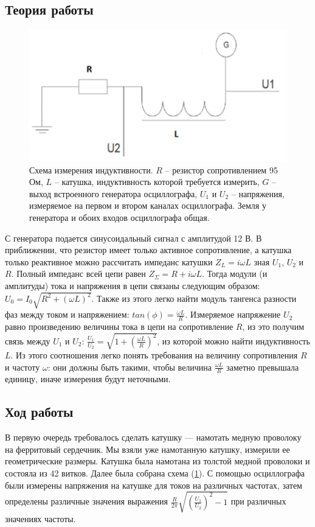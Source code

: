\documentclass[a4paper,14pt]{extarticle}
\begin{document}
		\subsection{Теория работы}
			\begin{figure}[h]
				\centering
				\includegraphics[width=.75\linewidth]{схема.png}
				\caption{Схема измерения индуктивности. $R$ – резистор сопротивлением 95 Ом, $L$ – катушка, индуктивность которой требуется измерить, $G$ – выход встроенного	генератора осциллографа, $U_1$ и $U_2$ – напряжения, измеряемое на первом и втором каналах осциллографа. Земля у генератора и обоих входов осциллографа общая.}
				\label{fig1}
			\end{figure}
			\newpage
			С генератора подается синусоидальный сигнал с амплитудой 12 В. В приближении, что резистор имеет только активное сопротивление, а катушка только реактивное можно рассчитать импеданс катушки $Z_L = i \omega L$ зная $U_1$, $U_2$ и $R$. Полный импеданс всей цепи равен $Z_\Sigma =	R + i \omega L$. Тогда модули (и амплитуды) тока и напряжения в цепи связаны следующим образом: $U_0 = I_0 \sqrt{R^2 + (\omega L)^2}$. Также из этого легко найти модуль тангенса разности фаз между током и напряжением: $tan(\phi) = \frac{\omega L}{R}$. Измеряемое напряжение $U_2$ равно произведению величины тока в цепи на сопротивление $R$, из это получим связь между $U_1$ и $U_2$: $\frac{U_1}{U_2} = \sqrt{1 + (\frac{\omega L}{R})^2}$, из которой можно найти индуктивность $L$. Из этого соотношения легко понять требования на величину сопротивления $R$ и частоту $\omega$: они должны быть такими, чтобы величина $\frac{\omega L}{R}$ заметно превышала единицу, иначе измерения будут неточными.
		\subsection{Ход работы}
			В первую очередь требовалось сделать катушку — намотать медную проволоку на
			ферритовый сердечник. Мы взяли уже намотанную катушку, измерили ее геометрические размеры. Катушка была намотана из толстой медной проволоки и состояла из 42 витков.
			Далее была собрана схема (\ref{fig1}). С помощью осциллографа были измерены напряжения на катушке для токов на различных частотах, затем определены различные значения выражения $\frac{R}{2\pi}\sqrt{(\frac{U_1}{U_2})^2 - 1}$ при различных значениях частоты.
\end{document}
